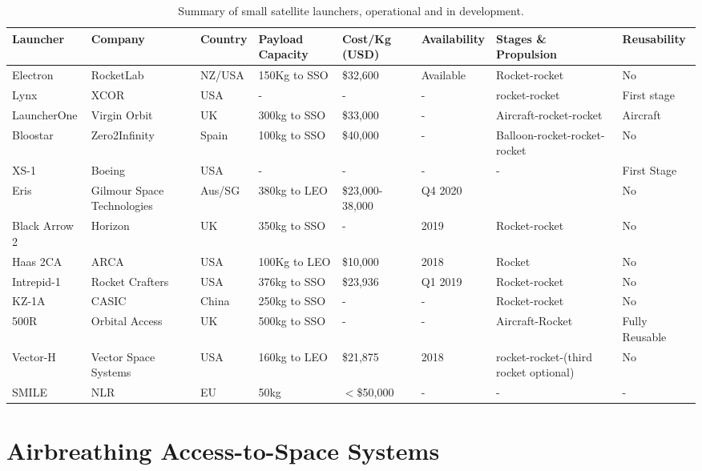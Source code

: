 \begin{landscape}
\begin{table}
\begin{tabularx}{\linewidth}{|X|X|X|X|X|X|X|X|}
  			\hline  \textbf{Launcher} & \textbf{Company} & \textbf{Country} & \textbf{Payload Capacity} & \textbf{Cost/Kg} (USD) & \textbf{Availability }& \textbf{Stages \& Propulsion} & \textbf{Reusability}  \\ 
  			\hline  Electron \cite{Electron} & RocketLab & NZ/USA & 150Kg to SSO & \$32,600 & Available & Rocket-rocket & No \\ 
  			\hline Lynx \cite{Lynx} &  XCOR & USA & - & - & - & rocket-rocket & First stage \\ 
  			\hline LauncherOne \cite{Virgin} & Virgin Orbit & UK & 300kg to SSO & \$33,000 & - & Aircraft-rocket-rocket & Aircraft\\ 
  			\hline Bloostar \cite{Bloostar} & Zero2Infinity & Spain & 100kg to SSO & \$40,000 &  - & Balloon-rocket-rocket-rocket & No \\ 
  			\hline XS-1 \cite{DARPA2017} & Boeing & USA & - & - &  - & - & First Stage\\ 
  			\hline Eris \cite{Gilmour} & Gilmour Space Technologies & Aus/SG& 380kg to LEO  &\$23,000-38,000   & Q4 2020 && No\\ 
  			\hline Black Arrow 2 \cite{Horizon}& Horizon   & UK & 350kg to SSO & - & 2019 & Rocket-rocket & No \\ 
  			\hline Haas 2CA \cite{ARCA} & ARCA  & USA & 100Kg to LEO & \$10,000 & 2018 & Rocket & No \\ 
  			\hline Intrepid-1 \cite{Intrepid} & Rocket Crafters  & USA & 376kg to SSO & \$23,936 & Q1 2019 & Rocket-rocket & No \\ 
  			\hline KZ-1A \cite{FT1} & CASIC  &  China & 250kg to SSO  & - & - & Rocket-rocket & No \\ 
  			\hline 500R \cite{500R} & Orbital Access  & UK & 500kg to SSO & - & - & Aircraft-Rocket & Fully Reusable \\ 
  			\hline Vector-H \cite{Vector}& Vector Space Systems  & USA & 160kg to LEO  & \$21,875 & 2018 & rocket-rocket-(third rocket optional)& No\\ 
  			\hline SMILE \cite{Kuhn2017} & NLR &  EU & 50kg & $<$\$50,000 & -  & -& -\\ 
  			\hline 
  		\end{tabularx} 
  		\caption{Summary of small satellite launchers, operational and in development.}
  		\label{tab:smallsats}
  	\end{table}
  \end{landscape}
  
  
  
  
  \section{Airbreathing Access-to-Space Systems}

